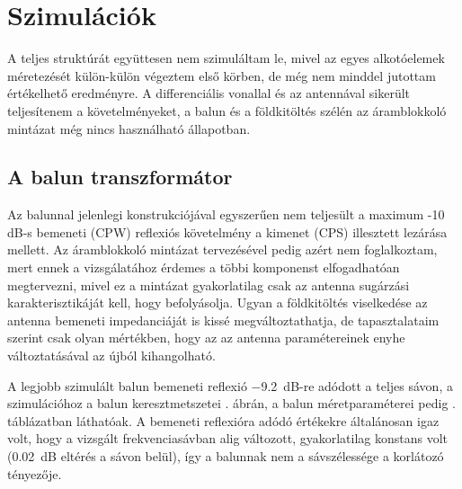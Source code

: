 \chapter{Szimulációk}
A teljes struktúrát együttesen nem szimuláltam le, mivel az egyes alkotóelemek méretezését külön-külön végeztem első körben, de még nem minddel jutottam értékelhető eredményre. A differenciális vonallal és az antennával sikerült teljesítenem a követelményeket, a balun és a földkitöltés szélén az áramblokkoló mintázat még nincs használható állapotban.
\section{A balun transzformátor}
\par Az balunnal jelenlegi konstrukciójával egyszerűen nem teljesült a maximum -10 dB-s bemeneti (CPW) reflexiós követelmény a kimenet (CPS) illesztett lezárása mellett. Az áramblokkoló mintázat tervezésével pedig azért nem foglalkoztam, mert ennek a vizsgálatához érdemes a többi komponenst elfogadhatóan megtervezni, mivel ez a mintázat gyakorlatilag csak az antenna sugárzási karakterisztikáját kell, hogy befolyásolja. Ugyan a földkitöltés viselkedése az antenna bemeneti impedanciáját is kissé megváltoztathatja, de tapasztalataim szerint csak olyan mértékben, hogy az az antenna paramétereinek enyhe változtatásával az újból kihangolható.
\par A legjobb szimulált balun bemeneti reflexió \SI{-9,2}{dB}-re adódott a teljes sávon, a szimulációhoz a balun keresztmetszetei . ábrán, a balun méretparaméterei pedig . táblázatban láthatóak. A bemeneti reflexióra adódó értékekre általánosan igaz volt, hogy a vizsgált frekvenciasávban alig változott, gyakorlatilag konstans volt (\SI{0,02}{dB} eltérés a sávon belül), így a balunnak nem a sávszélessége a korlátozó tényezője.
